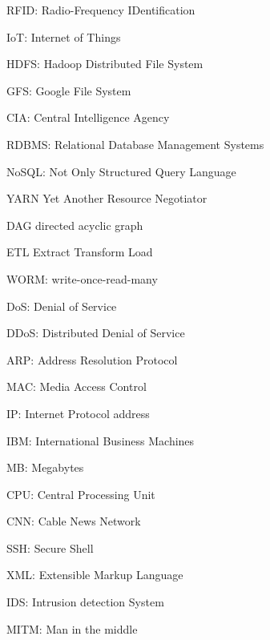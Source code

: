 \begin{basedescript}{\desclabelstyle{\pushlabel}\desclabelwidth{6em}}

\item[{RFID:}] Radio-Frequency IDentification%
\item[{IoT:}] Internet of Things%
\item[{HDFS:}] Hadoop Distributed File System%
\item[{GFS:}] Google File System%
\item[{CIA:}] Central Intelligence Agency%
\item[{RDBMS:}] Relational Database Management Systems%
\item[{NoSQL:}] Not Only Structured Query Language%
\item[{YARN}] Yet Another Resource Negotiator%
\item[{DAG}] directed acyclic graph%
\item[{ETL}] Extract Transform Load%
\item[{WORM:}] write-once-read-many%
\item[{DoS:}] Denial of Service%
\item[{DDoS:}] Distributed Denial of Service%
\item[{ARP:}] Address Resolution Protocol%
\item[{MAC:}] Media Access Control%
\item[{IP:}] Internet Protocol address%
\item[{IBM:}] International Business Machines%
\item[{MB:}] Megabytes%
\item[{CPU:}] Central Processing Unit%
\item[{CNN:}] Cable News Network%
\item[{SSH:}] Secure Shell%
\item[{XML:}] Extensible Markup Language%
\item[{IDS:}] Intrusion detection System%
\item[{MITM:}] Man in the middle%

\end{basedescript}